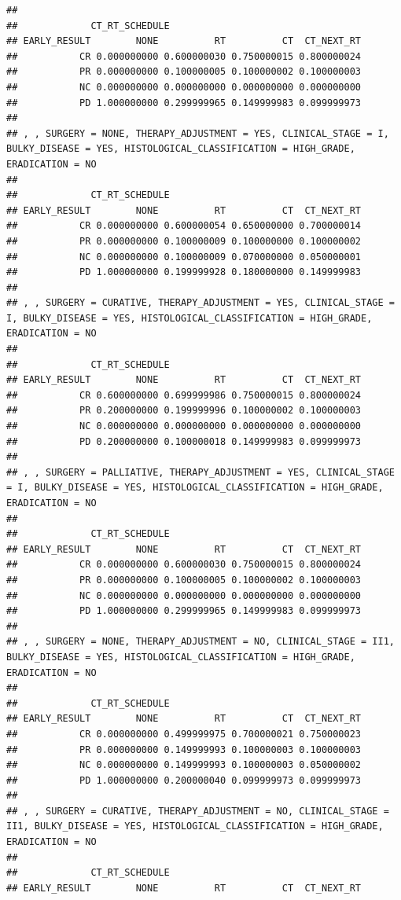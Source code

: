\documentclass[]{article}
\begin{document}
\begin{verbatim}
## 
##             CT_RT_SCHEDULE
## EARLY_RESULT        NONE          RT          CT  CT_NEXT_RT
##           CR 0.000000000 0.600000030 0.750000015 0.800000024
##           PR 0.000000000 0.100000005 0.100000002 0.100000003
##           NC 0.000000000 0.000000000 0.000000000 0.000000000
##           PD 1.000000000 0.299999965 0.149999983 0.099999973
## 
## , , SURGERY = NONE, THERAPY_ADJUSTMENT = YES, CLINICAL_STAGE = I, BULKY_DISEASE = YES, HISTOLOGICAL_CLASSIFICATION = HIGH_GRADE, ERADICATION = NO
## 
##             CT_RT_SCHEDULE
## EARLY_RESULT        NONE          RT          CT  CT_NEXT_RT
##           CR 0.000000000 0.600000054 0.650000000 0.700000014
##           PR 0.000000000 0.100000009 0.100000000 0.100000002
##           NC 0.000000000 0.100000009 0.070000000 0.050000001
##           PD 1.000000000 0.199999928 0.180000000 0.149999983
## 
## , , SURGERY = CURATIVE, THERAPY_ADJUSTMENT = YES, CLINICAL_STAGE = I, BULKY_DISEASE = YES, HISTOLOGICAL_CLASSIFICATION = HIGH_GRADE, ERADICATION = NO
## 
##             CT_RT_SCHEDULE
## EARLY_RESULT        NONE          RT          CT  CT_NEXT_RT
##           CR 0.600000000 0.699999986 0.750000015 0.800000024
##           PR 0.200000000 0.199999996 0.100000002 0.100000003
##           NC 0.000000000 0.000000000 0.000000000 0.000000000
##           PD 0.200000000 0.100000018 0.149999983 0.099999973
## 
## , , SURGERY = PALLIATIVE, THERAPY_ADJUSTMENT = YES, CLINICAL_STAGE = I, BULKY_DISEASE = YES, HISTOLOGICAL_CLASSIFICATION = HIGH_GRADE, ERADICATION = NO
## 
##             CT_RT_SCHEDULE
## EARLY_RESULT        NONE          RT          CT  CT_NEXT_RT
##           CR 0.000000000 0.600000030 0.750000015 0.800000024
##           PR 0.000000000 0.100000005 0.100000002 0.100000003
##           NC 0.000000000 0.000000000 0.000000000 0.000000000
##           PD 1.000000000 0.299999965 0.149999983 0.099999973
## 
## , , SURGERY = NONE, THERAPY_ADJUSTMENT = NO, CLINICAL_STAGE = II1, BULKY_DISEASE = YES, HISTOLOGICAL_CLASSIFICATION = HIGH_GRADE, ERADICATION = NO
## 
##             CT_RT_SCHEDULE
## EARLY_RESULT        NONE          RT          CT  CT_NEXT_RT
##           CR 0.000000000 0.499999975 0.700000021 0.750000023
##           PR 0.000000000 0.149999993 0.100000003 0.100000003
##           NC 0.000000000 0.149999993 0.100000003 0.050000002
##           PD 1.000000000 0.200000040 0.099999973 0.099999973
## 
## , , SURGERY = CURATIVE, THERAPY_ADJUSTMENT = NO, CLINICAL_STAGE = II1, BULKY_DISEASE = YES, HISTOLOGICAL_CLASSIFICATION = HIGH_GRADE, ERADICATION = NO
## 
##             CT_RT_SCHEDULE
## EARLY_RESULT        NONE          RT          CT  CT_NEXT_RT

\end{verbatim}
\end{document}
